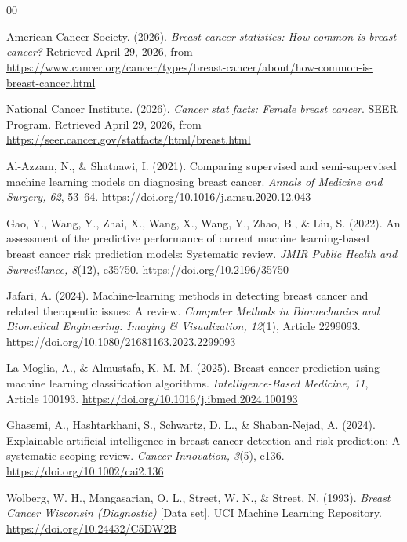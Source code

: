 \documentclass[conference]{IEEEtran}
\begin{document}
\section*{}
\begin{thebibliography}{00}

 American Cancer Society. (2026). \textit{Breast cancer statistics: How common is breast cancer?} Retrieved April 29, 2026, from \url{https://www.cancer.org/cancer/types/breast-cancer/about/how-common-is-breast-cancer.html}

 National Cancer Institute. (2026). \textit{Cancer stat facts: Female breast cancer}. SEER Program. Retrieved April 29, 2026, from \url{https://seer.cancer.gov/statfacts/html/breast.html}

 Al-Azzam, N., \& Shatnawi, I. (2021). Comparing supervised and semi-supervised machine learning models on diagnosing breast cancer. \textit{Annals of Medicine and Surgery, 62}, 53--64. \url{https://doi.org/10.1016/j.amsu.2020.12.043}

 Gao, Y., Wang, Y., Zhai, X., Wang, X., Wang, Y., Zhao, B., \& Liu, S. (2022). An assessment of the predictive performance of current machine learning-based breast cancer risk prediction models: Systematic review. \textit{JMIR Public Health and Surveillance, 8}(12), e35750. \url{https://doi.org/10.2196/35750}

 Jafari, A. (2024). Machine-learning methods in detecting breast cancer and related therapeutic issues: A review. \textit{Computer Methods in Biomechanics and Biomedical Engineering: Imaging \& Visualization, 12}(1), Article 2299093. \url{https://doi.org/10.1080/21681163.2023.2299093}

 La Moglia, A., \& Almustafa, K. M. M. (2025). Breast cancer prediction using machine learning classification algorithms. \textit{Intelligence-Based Medicine, 11}, Article 100193. \url{https://doi.org/10.1016/j.ibmed.2024.100193}

 Ghasemi, A., Hashtarkhani, S., Schwartz, D. L., \& Shaban-Nejad, A. (2024). Explainable artificial intelligence in breast cancer detection and risk prediction: A systematic scoping review. \textit{Cancer Innovation, 3}(5), e136. \url{https://doi.org/10.1002/cai2.136}

 Wolberg, W. H., Mangasarian, O. L., Street, W. N., \& Street, N. (1993). \textit{Breast Cancer Wisconsin (Diagnostic)} [Data set]. UCI Machine Learning Repository. \url{https://doi.org/10.24432/C5DW2B}


\end{thebibliography}
\end{document}
